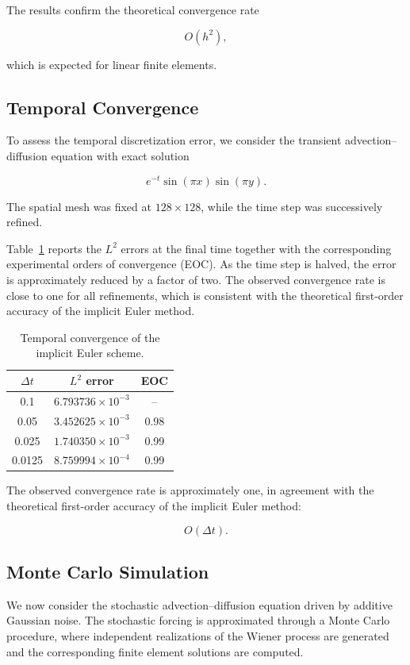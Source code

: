 The results confirm the theoretical convergence rate

\[
O(h^2),
\]

which is expected for linear finite elements.

\subsection{Temporal Convergence}

To assess the temporal discretization error, we 
consider the transient 
advection--diffusion equation with exact solution

\[
e^{-t}
\sin(\pi x)
\sin(\pi y).
\]

The spatial mesh was fixed at \(128\times128\), while 
the time step was successively refined.

Table~\ref{tab:temporal_convergence} reports the \(L^2\) errors at the final 
time together with the corresponding experimental orders 
of convergence (EOC). As the time step is halved, the 
error is approximately reduced by a factor of two. 
The observed convergence rate is close to one for all 
refinements, which is consistent with the theoretical 
first-order accuracy of the implicit Euler method.

\begin{table}[ht]
\centering
\caption{Temporal convergence of the implicit Euler scheme.}
\label{tab:temporal_convergence}
\begin{tabular}{ccc}
\hline
$\Delta t$ & $L^2$ error & EOC \\
\hline
0.1 & $6.793736\times10^{-3}$ & -- \\
0.05 & $3.452625\times10^{-3}$ & 0.98 \\
0.025 & $1.740350\times10^{-3}$ & 0.99 \\
0.0125 & $8.759994\times10^{-4}$ & 0.99 \\
\hline
\end{tabular}
\end{table}

The observed convergence rate is approximately one, in agreement with the theoretical 
first-order accuracy of the implicit Euler method:

\[
O(\Delta t).
\]

\subsection{Monte Carlo Simulation}

We now consider the stochastic advection--diffusion equation driven by additive 
Gaussian noise. The stochastic forcing is approximated through a Monte Carlo procedure, 
where independent realizations of the Wiener process are generated and the 
corresponding finite element solutions are computed.

